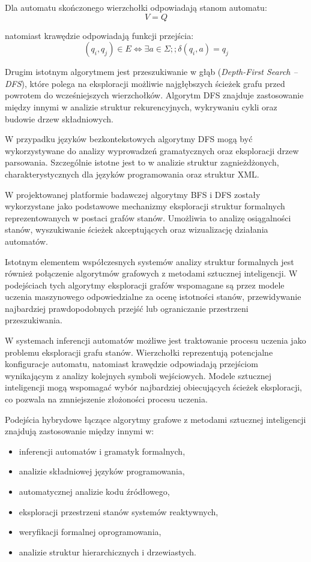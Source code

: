 \documentclass[12pt]{article}
\begin{document}
Dla automatu skończonego wierzchołki odpowiadają stanom automatu:
\begin{equation}
V = Q
\end{equation}

natomiast krawędzie odpowiadają funkcji przejścia:
\begin{equation}
(q_i, q_j) \in E \iff \exists a \in \Sigma ;; \delta(q_i,a)=q_j
\end{equation}

Drugim istotnym algorytmem jest przeszukiwanie w głąb (\textit{Depth-First Search -- DFS}), które polega na eksploracji możliwie najgłębszych ścieżek grafu przed powrotem do wcześniejszych wierzchołków. Algorytm DFS znajduje zastosowanie między innymi w analizie struktur rekurencyjnych, wykrywaniu cykli oraz budowie drzew składniowych.

W przypadku języków bezkontekstowych algorytmy DFS mogą być wykorzystywane do analizy wyprowadzeń gramatycznych oraz eksploracji drzew parsowania. Szczególnie istotne jest to w analizie struktur zagnieżdżonych, charakterystycznych dla języków programowania oraz struktur XML.

W projektowanej platformie badawczej algorytmy BFS i DFS zostały wykorzystane jako podstawowe mechanizmy eksploracji struktur formalnych reprezentowanych w postaci grafów stanów. Umożliwia to analizę osiągalności stanów, wyszukiwanie ścieżek akceptujących oraz wizualizację działania automatów.

Istotnym elementem współczesnych systemów analizy struktur formalnych jest również połączenie algorytmów grafowych z metodami sztucznej inteligencji. W podejściach tych algorytmy eksploracji grafów wspomagane są przez modele uczenia maszynowego odpowiedzialne za ocenę istotności stanów, przewidywanie najbardziej prawdopodobnych przejść lub ograniczanie przestrzeni przeszukiwania.

W systemach inferencji automatów możliwe jest traktowanie procesu uczenia jako problemu eksploracji grafu stanów. Wierzchołki reprezentują potencjalne konfiguracje automatu, natomiast krawędzie odpowiadają przejściom wynikającym z analizy kolejnych symboli wejściowych. Modele sztucznej inteligencji mogą wspomagać wybór najbardziej obiecujących ścieżek eksploracji, co pozwala na zmniejszenie złożoności procesu uczenia.

Podejścia hybrydowe łączące algorytmy grafowe z metodami sztucznej inteligencji znajdują zastosowanie między innymi w:
\begin{itemize}
\item inferencji automatów i gramatyk formalnych,
\item analizie składniowej języków programowania,
\item automatycznej analizie kodu źródłowego,
\item eksploracji przestrzeni stanów systemów reaktywnych,
\item weryfikacji formalnej oprogramowania,
\item analizie struktur hierarchicznych i drzewiastych.
\end{itemize}
\end{document}
